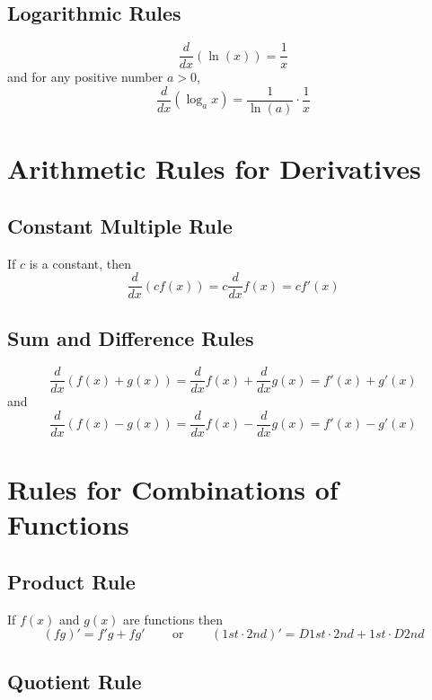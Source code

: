 \documentclass[
]{book}
\begin{document}
\hypertarget{logarithmic-rules}{%
\subsection{Logarithmic Rules}\label{logarithmic-rules}}

\[\frac{d}{dx}(\ln (x))=\frac{1}{x}\]
and for any positive number \(a >0\),
\[\frac{d}{dx}(\log_a x)= \frac{1}{\ln (a)} \cdot \frac{1}{x}\]

\hypertarget{arithmetic-rules-for-derivatives}{%
\section{Arithmetic Rules for Derivatives}\label{arithmetic-rules-for-derivatives}}

\hypertarget{constant-multiple-rule}{%
\subsection{Constant Multiple Rule}\label{constant-multiple-rule}}

If \(c\) is a constant, then
\[\frac{d}{dx}(cf(x))=c\frac{d}{dx}f(x)=cf'(x)\]

\hypertarget{sum-and-difference-rules}{%
\subsection{Sum and Difference Rules}\label{sum-and-difference-rules}}

\[\frac{d}{dx}(f(x)+g(x))=\frac{d}{dx}f(x)+\frac{d}{dx}g(x)=f'(x)+g'(x)\]
and
\[\frac{d}{dx}(f(x)-g(x))=\frac{d}{dx}f(x)-\frac{d}{dx}g(x)=f'(x)-g'(x)\]

\hypertarget{rules-for-combinations-of-functions}{%
\section{Rules for Combinations of Functions}\label{rules-for-combinations-of-functions}}

\hypertarget{product-rule}{%
\subsection{Product Rule}\label{product-rule}}

If \(f(x)\) and \(g(x)\) are functions then
\[(fg)'=f'g+fg' \phantom{hihi} \text{ or } \phantom{hihi}(1st \cdot 2nd )'=D1st \cdot 2nd + 1st \cdot D2nd\]

\hypertarget{quotient-rule}{%
\subsection{Quotient Rule}\label{quotient-rule}}
\end{document}
